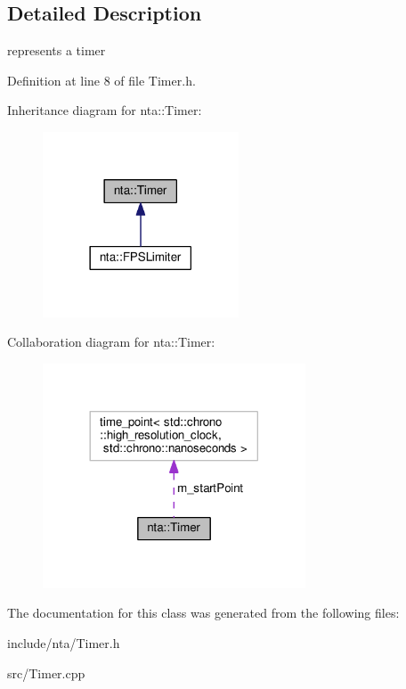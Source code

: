 \subsection{Detailed Description}
represents a timer 

Definition at line 8 of file Timer.\+h.



Inheritance diagram for nta\+:\+:Timer\+:\nopagebreak
\begin{figure}[H]
\begin{center}
\leavevmode
\includegraphics[width=165pt]{d3/d1b/classnta_1_1Timer__inherit__graph}
\end{center}
\end{figure}


Collaboration diagram for nta\+:\+:Timer\+:\nopagebreak
\begin{figure}[H]
\begin{center}
\leavevmode
\includegraphics[width=221pt]{d3/def/classnta_1_1Timer__coll__graph}
\end{center}
\end{figure}


The documentation for this class was generated from the following files\+:\begin{DoxyCompactItemize}
\item 
include/nta/Timer.\+h\item 
src/Timer.\+cpp\end{DoxyCompactItemize}
